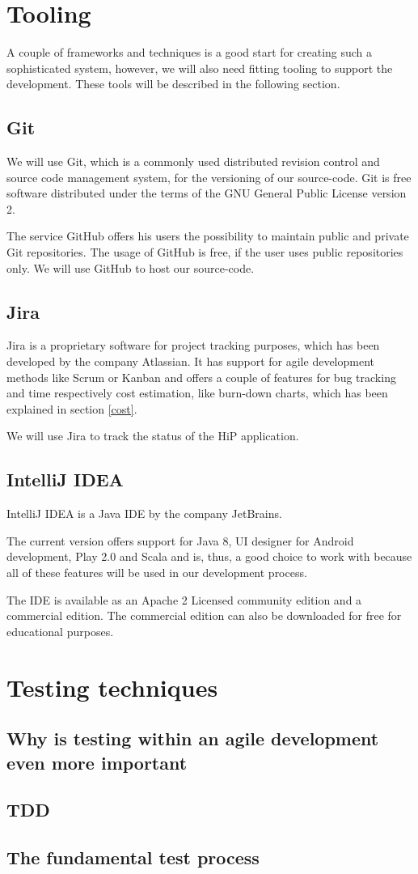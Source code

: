 \section{Tooling}
A couple of frameworks and techniques is a good start for creating such a sophisticated system, however, we will also need fitting tooling to support the development. These tools will be described in the following section.

\subsection{Git}
We will use Git, which is a commonly used distributed revision control and source code management system, for the versioning of our source-code. Git is free software distributed under the terms of the GNU General Public License version 2.

The service GitHub offers his users the possibility to maintain public and private Git repositories. The usage of GitHub is free, if the user uses public repositories only. We will use GitHub to host our source-code.

\subsection{Jira}
Jira is a proprietary software for project tracking purposes, which has been developed by the company Atlassian. It has support for agile development methods like Scrum or Kanban and offers a couple of features for bug tracking and time respectively cost estimation, like burn-down charts, which has been explained in section \ref{cost}. 

We will use Jira to track the status of the \ac{HiP} application.

\subsection{IntelliJ IDEA}
IntelliJ IDEA is a Java \ac{IDE} by the company JetBrains. 

The current version offers support for Java 8, UI designer for Android development, Play 2.0 and Scala and is, thus, a good choice to work with because all of these features will be used in our development process.

The \ac{IDE} is available as an Apache 2 Licensed community edition and a commercial edition. The commercial edition can also be downloaded for free for educational purposes.

\section{Testing techniques}	

\subsection{Why is testing within an agile development even more important}

\subsection{TDD}

\subsection{The fundamental test process}